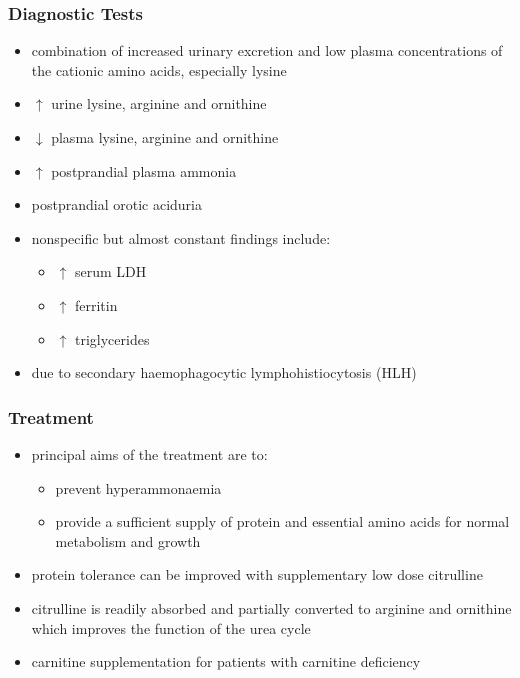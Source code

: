\documentclass{scrartcl}
\begin{document}
\subsubsection{Diagnostic Tests}
\label{sec:org23b3764}
\begin{itemize}
\item combination of increased urinary excretion and low plasma
concentrations of the cationic amino acids, especially lysine
\item \(\uparrow\) urine lysine, arginine and ornithine
\item \(\downarrow\) plasma lysine, arginine and ornithine
\item \(\uparrow\) postprandial plasma ammonia
\item postprandial orotic aciduria
\item nonspecific but almost constant findings include:
\begin{itemize}
\item \(\uparrow\)  serum LDH
\item \(\uparrow\) ferritin
\item \(\uparrow\) triglycerides
\end{itemize}
\item due to secondary haemophagocytic lymphohistiocytosis (HLH)
\end{itemize}

\subsubsection{Treatment}
\label{sec:orgf546b83}
\begin{itemize}
\item principal aims of the treatment are to:
\begin{itemize}
\item prevent hyperammonaemia
\item provide a sufficient supply of protein and essential amino acids
for normal metabolism and growth
\end{itemize}

\item protein tolerance can be improved with supplementary low dose
citrulline
\item citrulline is readily absorbed and partially converted to arginine
and ornithine which improves the function of the urea cycle
\item carnitine supplementation for patients with carnitine deficiency
\end{itemize}
\end{document}
